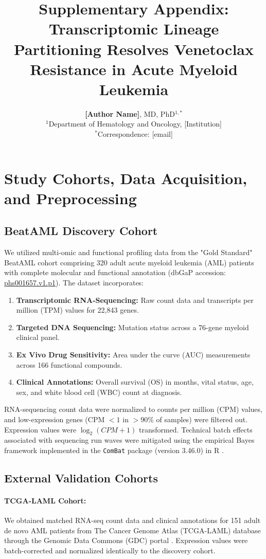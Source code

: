 \documentclass[11pt,a4paper]{article}
\title{\Large\textbf{Supplementary Appendix: Transcriptomic Lineage Partitioning Resolves Venetoclax Resistance in Acute Myeloid Leukemia}}
\author{
\textbf{[Author Name]}, MD, PhD$^{1,*}$ \\[0.3cm]
\small $^1$Department of Hematology and Oncology, [Institution] \\[0.2cm]
\small $^*$Correspondence: [email]
}
\date{}
\begin{document}
\maketitle

\tableofcontents
\newpage

\section{Study Cohorts, Data Acquisition, and Preprocessing}

\subsection{BeatAML Discovery Cohort}
We utilized multi-omic and functional profiling data from the "Gold Standard" BeatAML cohort comprising 320 adult acute myeloid leukemia (AML) patients with complete molecular and functional annotation (dbGaP accession: \href{https://www.ncbi.nlm.nih.gov/projects/gap/cgi-bin/study.cgi?study_id=phs001657.v1.p1}{phs001657.v1.p1}). The dataset incorporates:
\begin{enumerate}
    \item \textbf{Transcriptomic RNA-Sequencing:} Raw count data and transcripts per million (TPM) values for 22,843 genes.
    \item \textbf{Targeted DNA Sequencing:} Mutation status across a 76-gene myeloid clinical panel.
    \item \textbf{Ex Vivo Drug Sensitivity:} Area under the curve (AUC) measurements across 166 functional compounds.
    \item \textbf{Clinical Annotations:} Overall survival (OS) in months, vital status, age, sex, and white blood cell (WBC) count at diagnosis.
\end{enumerate}
RNA-sequencing count data were normalized to counts per million (CPM) values, and low-expression genes (CPM $< 1$ in $> 90\%$ of samples) were filtered out. Expression values were $\log_2(CPM + 1)$ transformed. Technical batch effects associated with sequencing run waves were mitigated using the empirical Bayes framework implemented in the \texttt{ComBat} package (version 3.46.0) in R \cite{johnson2007combat}.

\subsection{External Validation Cohorts}
\paragraph{TCGA-LAML Cohort:} We obtained matched RNA-seq count data and clinical annotations for 151 adult de novo AML patients from The Cancer Genome Atlas (TCGA-LAML) database through the Genomic Data Commons (GDC) portal \cite{cancer2013tcga}. Expression values were batch-corrected and normalized identically to the discovery cohort.
\end{document}
